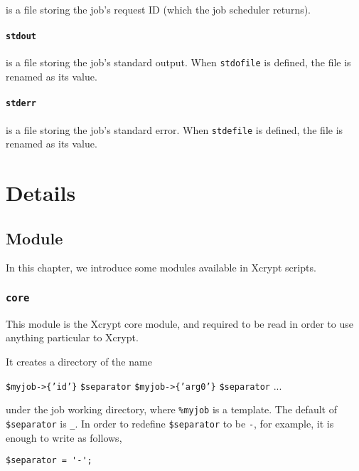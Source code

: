 \documentclass[a4paper,10pt]{report}
\begin{document}
is a file storing the job's request ID (which the job scheduler
returns).

\subsection*{\texttt{stdout}}

is a file storing the job's standard output.  When \texttt{stdofile}
is defined, the file is renamed as its value.

\subsection*{\texttt{stderr}}

is a file storing the job's standard error.  When \texttt{stdefile}
is defined, the file is renamed as its value.

\part{Details}
\chapter{Module}\label{chapmodule}

In this chapter, we introduce some modules available in Xcrypt scripts.

\section{\texttt{core}}

This module is the Xcrypt core module, and required to be read in
order to use anything particular to Xcrypt.

It creates a directory of the name
\begin{center}
 \texttt{\$myjob->\{'id'\}} \texttt{\$separator}
 \texttt{\$myjob->\{'arg0'\}} \texttt{\$separator} ...
\end{center}
under the job working directory, where \texttt{\%myjob} is a template.
The default of \texttt{\$separator} is \texttt{\_}.  In order to
redefine \texttt{\$separator} to be \texttt{-}, for example, it is
enough to write as follows,
\begin{boxnote}
\begin{verbatim}
$separator = '-';
\end{verbatim}
\end{boxnote}
\vspace{\baselineskip}
\end{document}
